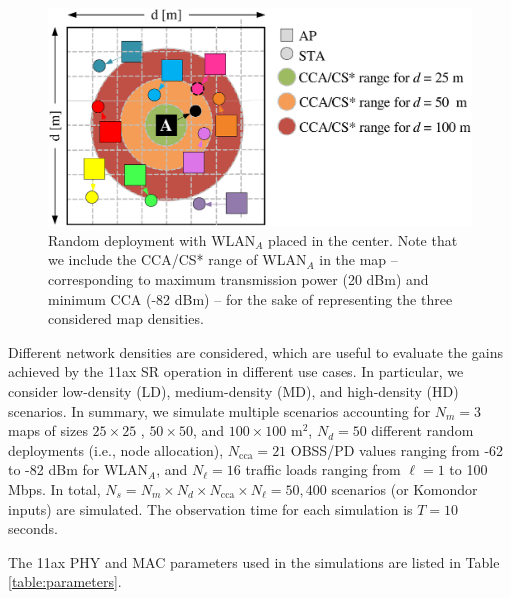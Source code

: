 \documentclass[conference]{IEEEtran}
\begin{document}
	\begin{figure}[ht!]
		\centering
		\includegraphics[width=\columnwidth]{map_central}
		\caption{Random deployment with WLAN$_A$ placed in the center. Note that we include the CCA/CS* range of WLAN$_A$ in the map -- corresponding to maximum transmission power (20 dBm) and minimum CCA (-82 dBm) -- for the sake of representing the three considered map densities.}
		\label{fig:random_scenario}
	\end{figure}
	
	Different network densities are considered, which are useful to evaluate the gains achieved by the 11ax SR operation in different use cases. In particular, we consider low-density (LD), medium-density (MD), and high-density (HD) scenarios. In summary, we simulate multiple scenarios accounting for $N_m = 3$ maps of sizes $25 \times 25$ , $50 \times 50$, and $100 \times 100$ m$^2$, $N_d = 50$ different random deployments (i.e., node allocation), $N_\text{cca} = 21$ OBSS/PD values ranging from -62 to -82 dBm for WLAN$_A$, and $N_\ell = 16$ traffic loads ranging from $\ell = 1$ to 100 Mbps. In total, $N_s =  N_m \times N_d \times N_\text{cca} \times N_\ell = 50,400$ scenarios (or Komondor inputs) are simulated. The observation time for each simulation is $T = 10$ seconds.
	
	The 11ax PHY and MAC parameters used in the simulations are listed in Table \ref{table:parameters}.
	
\end{document}
